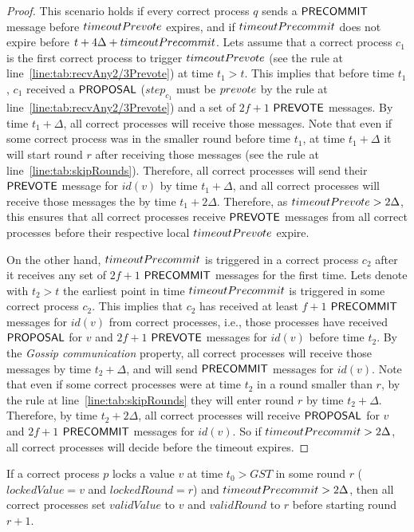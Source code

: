 \begin{proof}
This scenario holds if every correct process $q$ sends a $\mathsf{PRECOMMIT}$ message before $timeoutPrevote$ expires, and if $timeoutPrecommit$ does not expire before $t + 4\Delta + timeoutPrecommit$. 
Lets assume that a correct process $c_1$ is the first correct process to trigger $timeoutPrevote$ (see the rule at line~\ref{line:tab:recvAny2/3Prevote}) at time $t_1 > t$. This implies that before time $t_1$, $c_1$ received a $\mathsf{PROPOSAL}$ ($step_{c_1}$ must be $prevote$ by the rule at line~\ref{line:tab:recvAny2/3Prevote}) and a set of $2f+1$ $\mathsf{PREVOTE}$ messages.
By time $t_1 + \Delta$, all correct processes will receive those messages. Note that even if some correct process was in the smaller round before time $t_1$, at time $t_1 + \Delta$ it will start round $r$ after receiving those messages (see the rule at line~\ref{line:tab:skipRounds}). 
Therefore, all correct processes will send their $\mathsf{PREVOTE}$ message for $id(v)$ by time $t_1 + \Delta$, and all correct processes will receive those messages the by time $t_1 + 2\Delta$. 
Therefore, as $timeoutPrevote > 2\Delta$, this ensures that all correct processes receive $\mathsf{PREVOTE}$ messages from all correct processes before their respective local $timeoutPrevote$ expire.   

On the other hand, $timeoutPrecommit$ is triggered in a correct process $c_2$ after it receives any set of $2f+1$ $\mathsf{PRECOMMIT}$ messages for the first time. Lets denote with $t_2 > t$ the earliest point in time $timeoutPrecommit$ is triggered in some correct process $c_2$. This implies that $c_2$ has received at least $f+1$ $\mathsf{PRECOMMIT}$ messages for $id(v)$ from correct processes, i.e., those processes have received $\mathsf{PROPOSAL}$ for $v$ and $2f+1$ $\mathsf{PREVOTE}$ messages for $id(v)$ before time $t_2$. By the \emph{Gossip communication} property, all correct processes will receive those messages by time $t_2 + \Delta$, and will send $\mathsf{PRECOMMIT}$ messages for $id(v)$. Note that even if some correct processes were at time $t_2$ in a round smaller than $r$,
by the rule at line~\ref{line:tab:skipRounds} they will enter round $r$ by time $t_2 + \Delta$.
Therefore, by time $t_2 + 2\Delta$, all correct processes will receive $\mathsf{PROPOSAL}$ for $v$ and $2f+1$ $\mathsf{PRECOMMIT}$ messages for $id(v)$. So if $timeoutPrecommit > 2\Delta$, all correct processes will decide before the timeout expires.         
\end{proof}	


\begin{lemma}
	\label{lemma:validValue}
If a correct process $p$ locks a value $v$ at time $t_0 > GST$ in some round $r$ ($lockedValue = v$ and $lockedRound = r$) and $timeoutPrecommit> 2\Delta$, then all correct processes set $validValue$ to $v$ and $validRound$ to $r$ before starting round $r+1$. 
\end{lemma}
 
